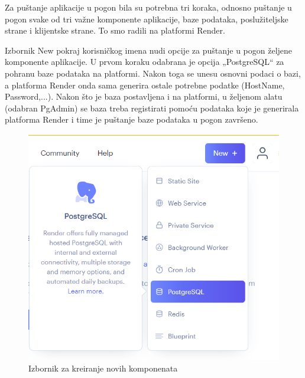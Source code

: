 			Za puštanje aplikacije u pogon bila su potrebna tri koraka, odnosno puštanje u pogon svake od tri važne komponente aplikacije, baze podataka, poslužiteljske strane i klijentske strane. To smo radili na platformi Render. 
			
			Izbornik New pokraj korisničkog imena nudi opcije za puštanje u pogon željene komponente aplikacije. U prvom koraku odabrana je opcija „PostgreSQL“ za pohranu baze podataka na platformi. Nakon toga se unesu osnovni podaci o bazi, a platforma Render onda sama generira ostale potrebne podatke (HostName, Password,...). Nakon što je baza postavljena i na platformi, u željenom alatu (odabran PgAdmin) se baza treba registirati pomoću podataka koje je generirala platforma Render i time je puštanje baze podataka u pogon završeno.
			
			\begin{figure}[H]
				\includegraphics[width=\textwidth]{slike/IzbordnikNew.PNG} 
				\caption{Izbornik za kreiranje novih komponenata}
				\label{fig:Izbornik}
			\end{figure}
		
